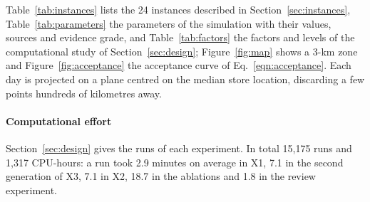 \documentclass[a4paper,11pt,review,3p,authoryear]{elsarticle}
\begin{document}
Table~\ref{tab:instances} lists the 24 instances described in Section~\ref{sec:instances}, Table~\ref{tab:parameters} the parameters of the simulation with their values, sources and evidence grade, and Table~\ref{tab:factors} the factors and levels of the computational study of Section~\ref{sec:design}; Figure~\ref{fig:map} shows a 3-km zone and Figure~\ref{fig:acceptance} the acceptance curve of Eq.~\eqref{eqn:acceptance}. Each day is projected on a plane centred on the median store location, discarding a few points hundreds of kilometres away.

\paragraph{Computational effort} Section~\ref{sec:design} gives the runs of each experiment. In total 15{,}175 runs and 1{,}317 CPU-hours: a run took 2.9 minutes on average in X1, 7.1 in the second generation of X3, 7.1 in X2, 18.7 in the ablations and 1.8 in the review experiment.
\end{document}
